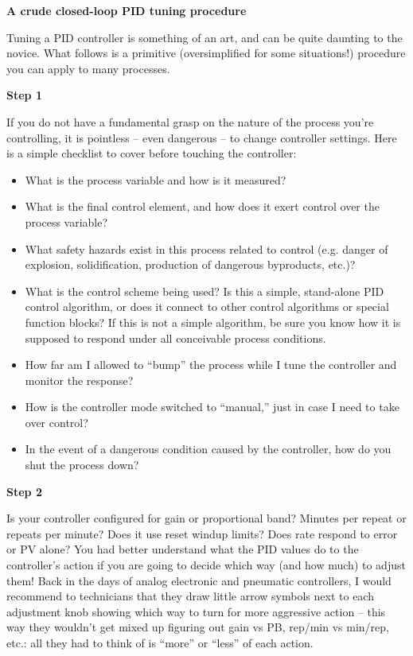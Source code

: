 \documentclass[12pt,a4paper]{article}
\begin{document}
\vfil \eject

\centerline{\bf A crude closed-loop PID tuning procedure}

\vskip 10pt

Tuning a PID controller is something of an art, and can be quite daunting to the novice.  What follows is a primitive (oversimplified for some situations!) procedure you can apply to many processes.

\vskip 10pt

\noindent
{\bf Step 1}

  If you do not have a fundamental grasp on the nature of the process you're controlling, it is pointless -- even dangerous -- to change controller settings.  Here is a simple checklist to cover before touching the controller:

\begin{itemize}
\item{} What is the process variable and how is it measured?
\item{} What is the final control element, and how does it exert control over the process variable?
\item{} What safety hazards exist in this process related to control (e.g. danger of explosion, solidification, production of dangerous byproducts, etc.)?  
\item{} What is the control scheme being used?  Is this a simple, stand-alone PID control algorithm, or does it connect to other control algorithms or special function blocks?  If this is not a simple algorithm, be sure you know how it is supposed to respond under all conceivable process conditions.
\item{} How far am I allowed to ``bump'' the process while I tune the controller and monitor the response?
\item{} How is the controller mode switched to ``manual,'' just in case I need to take over control?
\item{} In the event of a dangerous condition caused by the controller, how do you shut the process down?
\end{itemize}

\vskip 10pt

\noindent
{\bf Step 2}

  Is your controller configured for gain or proportional band?  Minutes per repeat or repeats per minute?  Does it use reset windup limits?  Does rate respond to error or PV alone?  You had better understand what the PID values do to the controller's action if you are going to decide which way (and how much) to adjust them!  Back in the days of analog electronic and pneumatic controllers, I would recommend to technicians that they draw little arrow symbols next to each adjustment knob showing which way to turn for more aggressive action -- this way they wouldn't get mixed up figuring out gain vs PB, rep/min vs min/rep, etc.: all they had to think of is ``more'' or ``less'' of each action.
\end{document}
